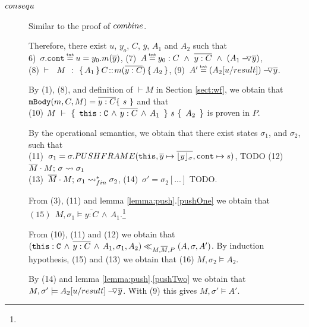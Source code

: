 \begin{description}
\item[${\sc{consequ}}$] Similar to the proof of  ${\sc{combine}}$. 


\item[ {}]

Therefore, there exist $u$, $y_o$, $C$, $\overline y$,  $A_1$ and $A_2$ such that \\
6)\ $\sigma.\prg{cont}\txteq u=y_0.m(\overline y)$,   \hspace{2cm}
 (7)\ $A \txteq y_0:C  \ \wedge\ \overline {y:C}\ \wedge \  (\PushAS  {y} {A_1})$, 
\\
 (8)\ $\promises M {\mprepost{A_1}{C}{m}{y}{C}{  {A_2}} }$,    \hspace{1cm}
 (9)\ $A' \txteq  {\PushAS  {y} {(A_2[ u/result])}}$. 

By (1), (8), and definition of $\vdash M$ in Section \ref{sect:wf}, we obtain that   $\prg{mBody}(m,C,M)=\overline{y:C}\{\  s \ \}$ and that\\
(10)   ${\hproves{M} { \ \prg{this}:\prg{C}\, \wedge\, \overline{y:C}\, \wedge\, A_1\  } {\ s\ } {\ A_2\ } }$ is proven in $P$.
 
 By the operational semantics, we obtain that there exist states $\sigma_1$, and $\sigma_2$, such that \\
 (11)\ $\sigma_1=\sigma.PUSHFRAME(\prg{this}, {\overline y} \mapsto \overline{\interpret {\sigma} y},\prg{cont} \mapsto s) $, TODO   \hspace{1cm}
   (12)\ $\leadstoBounded  {\Mtwo\cdot M}  {\sigma}  {\sigma_1}$ \\
 (13)\ $\leadstoBoundedStarFin {\Mtwo\cdot M}  {\sigma_1}  {\sigma_2}$,   \hspace{3cm}
 (14)\ $\sigma'=\sigma_2[...]$ TODO.
 
 From (3), (11) and lemma \ref{lemma:push}.\ref{pushOne}  we obtain that \ \ \  $ (15) \ \ M, \sigma_1 \models \overline{y:C}\, \wedge\, A_1$.\footnote{}
 
 From (10), (11) and (12) we obtain that $( \prg{this}:\prg{C}\, \wedge\, \overline{y:C}\, \wedge\, A_1,\sigma_1,A_2) \ll_{M,\Mtwo,P} (A,\sigma,A')$. By induction hypothesis, (15) and (13) we obtain that (16) $M,\sigma_2 \models A_2$.
 
 By (14) and lemma  \ref{lemma:push}.\ref{pushTwo}  we obtain that 
\ \ $M,\sigma' \models \PushAS  {y} {A_2[ u/result]}$. \. With (9) this gives $M,\sigma' \models A'$.


\end{description}
